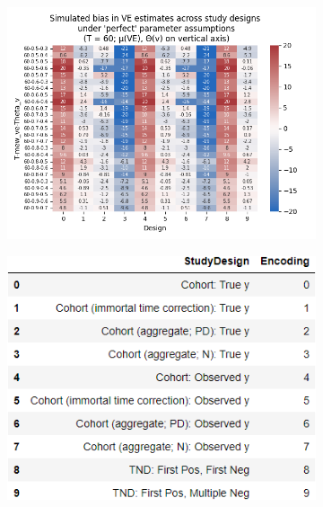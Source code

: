 \documentclass[12pt]{article}
\begin{document}
\begin{figure}[H]
	\begin{subfigure}[c]{0.48\linewidth}
		\centering
		\caption{}
		\includegraphics[scale=0.55]{VEMethod_Sim1b_PureDesignBias_Heatmap60.png}
	\end{subfigure}
	\begin{subfigure}[c]{0.48\linewidth}
		\centering
		\caption{}
		\includegraphics[scale=0.55]{VEmethod_RelDirection1b_DictDesign.png}
	\end{subfigure}
\end{figure}
\end{document}
